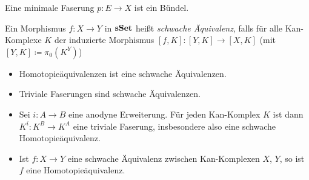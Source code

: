\documentclass{cheat-sheet}
\newenvironment{centertikzcd}
  {\begin{center}\begin{tikzcd}}
  {\end{tikzcd}\end{center}}
\begin{document}
\begin{lem}
  Eine minimale Faserung $p : E \to X$ ist ein Bündel.
\end{lem}

\begin{defn}
  Ein Morphismus $f : X \to Y$ in $\mathbf{sSet}$ heißt \emph{schwache Äquivalenz}, falls für alle Kan-Komplexe $K$ der induzierte Morphismus $[f, K] : [Y, K] \to [X, K]$ (mit $[Y, K] \coloneqq \pi_0(K^Y)$)
\end{defn}

\begin{bspe}
  \begin{itemize}
    \item Homotopieäquivalenzen ist eine schwache Äquivalenzen.
    \item Triviale Faserungen sind schwache Äquivalenzen.
    \item Sei $i : A \to B$ eine anodyne Erweiterung.
    Für jeden Kan-Komplex $K$ ist dann $K^i : K^B \to K^A$ eine triviale Faserung, insbesondere also eine schwache Homotopieäquivalenz.
    \item Ist $f : X \to Y$ eine schwache Äquivalenz zwischen Kan-Komplexen $X$, $Y$, so ist $f$ eine Homotopieäquivalenz.
  \end{itemize}
\end{bspe}


\end{document}
